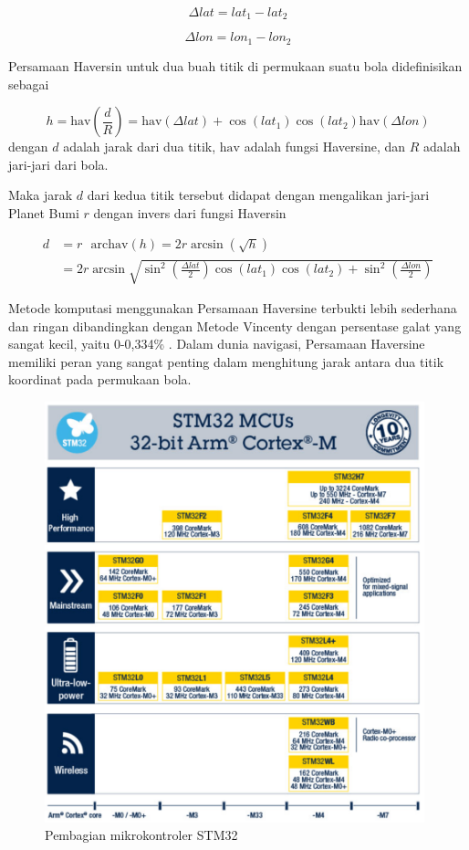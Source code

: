 \begin{equation}
	\Delta lat = lat_1 - lat_2
	\label{eq:delt-lat}
\end{equation}

\begin{equation}
	\Delta lon = lon_1 - lon_2
	\label{eq:delt-lon}
\end{equation}


Persamaan Haversin untuk dua buah titik di permukaan suatu bola didefinisikan sebagai

\begin{equation}
	h = \mathrm{hav}\left(\frac{d}{R}\right) = \mathrm{hav}\left(\Delta lat\right) + \cos{\left(lat_1\right)} \cos{\left(lat_2\right)} \mathrm{hav}\left(\Delta lon\right)
	\label{eq:haversine2}
\end{equation}
dengan $d$ adalah jarak dari dua titik, $\mathrm{hav}$ adalah fungsi Haversine, dan $R$ adalah jari-jari dari bola.

Maka jarak $d$ dari kedua titik tersebut didapat dengan mengalikan jari-jari Planet Bumi $r$ dengan invers dari fungsi Haversin \cite{Omatu2013}

$$
\begin{aligned}
	d &= r \text{ }\mathrm{archav}(h) = 2r \arcsin{\left(\sqrt{h}\right)} \\
	&= 2r \arcsin{\sqrt{\sin^2{\left(\frac{\Delta lat}{2}\right)}  \cos{(lat_1)}\cos{(lat_2)} +\sin^2{\left(\frac{\Delta lon}{2}\right)}}}
\end{aligned} 
$$

Metode komputasi menggunakan Persamaan Haversine terbukti lebih sederhana dan ringan dibandingkan dengan Metode Vincenty dengan persentase galat yang sangat kecil, yaitu 0-0,334\% \cite{Mahmoud2016}. Dalam dunia navigasi, Persamaan Haversine memiliki peran yang sangat penting dalam menghitung jarak antara dua titik koordinat pada permukaan bola.

\begin{figure}[H]
	\centering
	\includegraphics[width=11cm]{contents/chapter-2/stm-32-groups.png}
	\caption{Pembagian mikrokontroler STM32 \cite{STMicroelectronics2023}}
	\label{Fig: stm32-groups}
\end{figure}
